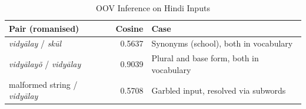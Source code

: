 \documentclass[conference,10pt]{IEEEtran}
\begin{document}
\begin{table}[!t]
\caption{OOV Inference on Hindi Inputs}
\label{tab:oov}
\centering
\renewcommand{\arraystretch}{1.2}
\footnotesize
\begin{tabular}{|p{2.6cm}|r|p{3.4cm}|}
\hline
\rowcolor{srcblue!15}
\textbf{Pair (romanised)} & \textbf{Cosine} & \textbf{Case} \\
\hline
\textit{vidy\=alay} / \textit{sk\=ul} & 0.5637 & Synonyms (school), both in vocabulary \\
\hline
\textit{vidy\=alay\~o} / \textit{vidy\=alay} & 0.9039 & Plural and base form, both in vocabulary \\
\hline
malformed string / \textit{vidy\=alay} & 0.5708 & Garbled input, resolved via subwords \\
\hline
\end{tabular}
\end{table}
\end{document}
